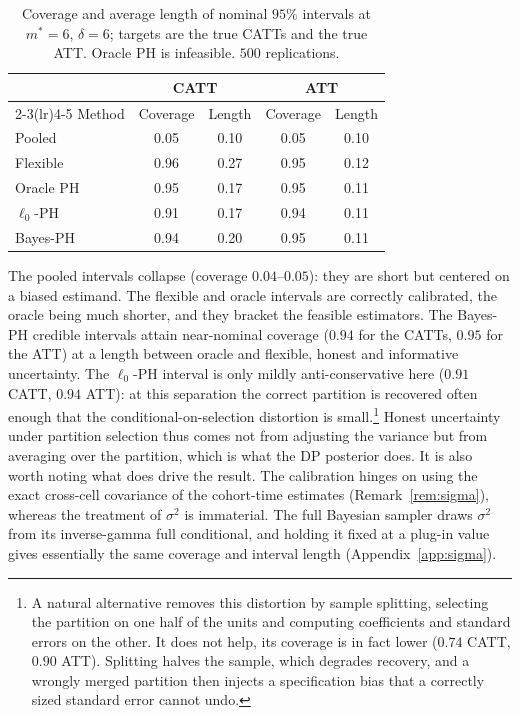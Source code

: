 \documentclass[margin=5in, 12pt]{article}
\newcommand{\1}{\mathbbm{1}}
\begin{document}
\begin{table}[H]
  \centering
  \caption{Coverage and average length of nominal $95\%$ intervals at
  $m^{\ast}=6$, $\delta=6$; targets are the true CATTs and the true ATT. Oracle PH
  is infeasible. $500$ replications.}
  \label{tab:sim:cov}
  \small
  \begin{tabular}{lcccc}
    \toprule
    & \multicolumn{2}{c}{CATT} & \multicolumn{2}{c}{ATT} \\
    \cmidrule(lr){2-3}\cmidrule(lr){4-5}
    Method & Coverage & Length & Coverage & Length \\
    \midrule
    Pooled                 & 0.05 & 0.10 & 0.05 & 0.10 \\
    Flexible               & 0.96 & 0.27 & 0.95 & 0.12 \\
    Oracle PH              & 0.95 & 0.17 & 0.95 & 0.11 \\
    $\ell_0$-PH             & 0.91 & 0.17 & 0.94 & 0.11 \\
    Bayes-PH               & 0.94 & 0.20 & 0.95 & 0.11 \\
    \bottomrule
  \end{tabular}
\end{table}

The pooled intervals collapse (coverage $0.04$--$0.05$): they are short but
centered on a biased estimand. The flexible and oracle intervals are correctly
calibrated, the oracle being much shorter, and they bracket the feasible
estimators. The Bayes-PH credible intervals attain near-nominal coverage
($0.94$ for the CATTs, $0.95$ for the ATT) at a length between oracle and
flexible, honest and informative uncertainty. The $\ell_0$-PH interval is
only mildly anti-conservative here ($0.91$ CATT, $0.94$ ATT): at this separation
the correct partition is recovered often enough that the conditional-on-selection
distortion is small.\footnote{A natural alternative removes this distortion by
sample splitting, selecting the partition on one half of the units and computing
coefficients and standard errors on the other. It does not help, its coverage is
in fact lower ($0.74$ CATT, $0.90$ ATT). Splitting halves the sample, which
degrades recovery, and a wrongly merged partition then injects a specification
bias that a correctly sized standard error cannot undo.} Honest uncertainty under
partition selection thus comes not from adjusting the variance but from averaging
over the partition, which is what the DP posterior does.
It is also worth noting what does drive the result. The calibration hinges on
using the exact cross-cell covariance of the cohort-time estimates
(Remark~\ref{rem:sigma}), whereas the treatment of $\sigma^2$ is immaterial. The
full Bayesian sampler draws $\sigma^2$ from its inverse-gamma full conditional, and
holding it fixed at a plug-in value gives essentially the same coverage and
interval length (Appendix~\ref{app:sigma}).
\end{document}
